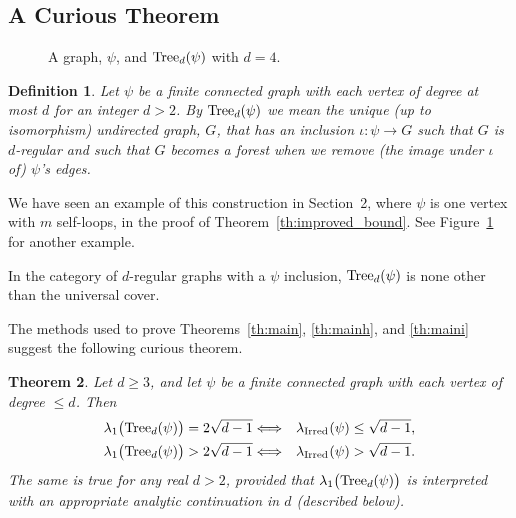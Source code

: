 \documentclass[12pt]{article}
\newtheorem{theorem}{Theorem}[section]
\newtheorem{definition}[theorem]{Definition}
\newcommand{\from}{\colon}
\newcommand{\tang}{{\psi}}	%
\newcommand{\tree}{{\rm Tree}}
\newcommand{\ird}[1]{{\rm Irred}_{#1}}
\begin{document}
\subsection{A Curious Theorem}

\begin{figure}
    \centering
        \epsfysize=2.5in
    \caption{A graph, $\tang$, and ${\rm Tree}_d(\tang)$
	with $d=4$.}
    \label{fg:dtree}
\end{figure}


\begin{definition} Let
$\tang$ be a finite connected graph with each vertex of degree at
most $d$ for
an integer $d>2$. 
By $\tree_d(\tang)$ we mean the unique
(up to isomorphism) undirected graph, $G$,
that has an inclusion $\iota\from \tang\to G$
such that $G$ is $d$-regular
and such that $G$ becomes a forest when we remove (the
image under $\iota$ of) $\tang$'s edges.
\end{definition} 
We have seen an example of this construction in Section~2, where
$\tang$ is one vertex with $m$ self-loops, in the proof of
Theorem~\ref{th:improved_bound}.  See Figure~\ref{fg:dtree} for
another example.

In the category of $d$-regular graphs with a $\tang$ inclusion,
$\tree_d(\tang)$ is none other than the universal cover.

The methods used to prove Theorems~\ref{th:main}, \ref{th:mainh},
and \ref{th:maini}
suggest the following curious theorem.

\begin{theorem}\label{th:remarkable}
Let $d\ge 3$, and let $\tang$ be a finite connected
graph with each vertex of degree
$\le d$.  Then
\begin{eqnarray*}
\lambda_1\bigl( \tree_d(\tang) \bigr)=2\sqrt{d-1} & \Longleftrightarrow &
\lambda_{\ird{}}(\tang)\le\sqrt{d-1}, \\ 
\lambda_1\bigl( \tree_d(\tang) \bigr)>2\sqrt{d-1}  & \Longleftrightarrow &
\lambda_{\ird{}}(\tang)
>\sqrt{d-1}.
\end{eqnarray*}
The same is true for any real $d>2$, provided that
$\lambda_1\bigl( \tree_d(\tang) \bigr)$ is interpreted with an appropriate
analytic continuation in $d$ (described below).
\end{theorem}
\end{document}
